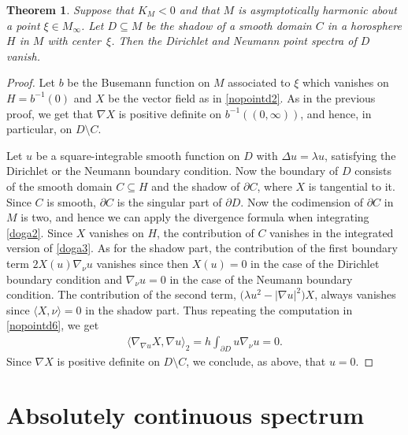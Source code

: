 \documentclass[10pt,a4paper]{amsart}
\numberwithin{equation}{section}
\newtheorem{Theorem}{Theorem}[section]
\begin{document}
\begin{Theorem}\label{nopointd8}
Suppose that $K_M<0$ and that $M$ is asymptotically harmonic about a point $\xi\in M_\infty$.
Let $D\subseteq M$ be the shadow of a smooth domain $C$ in a horosphere $H$ in $M$ with center~$\xi$.
Then the Dirichlet and Neumann point spectra of $D$ vanish.
\end{Theorem}

\begin{proof}
Let $b$ be the Busemann function on $M$ associated to $\xi$ which vanishes on $H = b^{-1}(0)$
and $X$ be the vector field as in \eqref{nopointd2}.
As in the previous proof, we get that $\nabla X$ is positive definite on $b^{-1}((0,\infty))$,
and hence, in particular, on $D \setminus C$.

Let $u$ be a square-integrable smooth function on $D $ with $\Delta u=\lambda u$,
satisfying the Dirichlet or the Neumann boundary condition.
Now the boundary of $D$ consists of the smooth domain $C\subseteq H$
and the shadow of $\partial C$, where $X$ is tangential to it.
Since $C$ is smooth, $\partial C$ is the singular part of $\partial D$.
Now the codimension of $\partial C$ in $M$ is two,
and hence we can apply the divergence formula when integrating \eqref{doga2}.
Since $X$ vanishes on $H$,
the contribution of $C$ vanishes in the integrated version of \eqref{doga3}.
As for the shadow part, the contribution of the first boundary term $2X(u)\nabla_\nu u$ vanishes
since then $X(u)=0$ in the case of the Dirichlet boundary condition
and $\nabla_\nu u=0$ in the case of the Neumann boundary condition.
The contribution of the second term, $\bigl(\lambda u^2-|\nabla u|^2\bigr)X$,
always vanishes since $\langle X,\nu\rangle=0$ in the shadow part.
Thus repeating the computation in \eqref{nopointd6}, we get
\begin{align*}
	\langle\nabla_{\nabla u}X,\nabla u\rangle_2 = h\int_{\partial D }u\nabla_\nu u = 0.
\end{align*}
Since $\nabla X$ is positive definite on $D \setminus C$, we conclude, as above, that $u=0$.
\end{proof}

\section{Absolutely continuous spectrum}%
\end{document}
